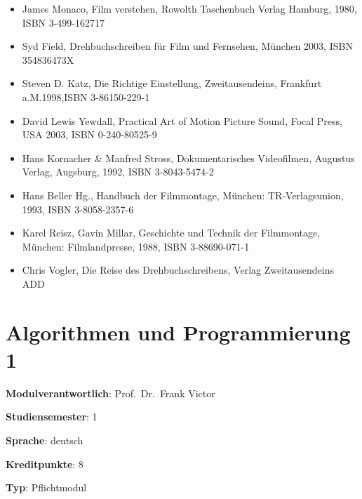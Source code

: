 \begin{itemize}
\tightlist
\item
  James Monaco, Film verstehen, Rowolth Taschenbuch Verlag Hamburg,
  1980, ISBN 3-499-162717
\item
  Syd Field, Drehbuchschreiben für Film und Fernsehen, München 2003,
  ISBN 354836473X
\item
  Steven D. Katz, Die Richtige Einstellung, Zweitausendeins, Frankfurt
  a.M.1998,ISBN 3-86150-229-1
\item
  David Lewis Yewdall, Practical Art of Motion Picture Sound, Focal
  Press, USA 2003, ISBN 0-240-80525-9
\item
  Hans Kornacher \& Manfred Stross, Dokumentarisches Videofilmen,
  Augustus Verlag, Augsburg, 1992, ISBN 3-8043-5474-2
\item
  Hans Beller Hg., Handbuch der Filmmontage, München: TR-Verlagsunion,
  1993, ISBN 3-8058-2357-6
\item
  Karel Reisz, Gavin Millar, Geschichte und Technik der Filmmontage,
  München: Filmlandpresse, 1988, ISBN 3-88690-071-1
\item
  Chris Vogler, Die Reise des Drehbuchschreibens, Verlag Zweitausendeins
  ADD
\end{itemize}

\hypertarget{algorithmen-und-programmierung-1pathlabelmi-2017modulbeschreibungen-bachelorba_algorithmenundprogrammierung1}{%
\chapter{Algorithmen und Programmierung
1\label{/mi-2017/modulbeschreibungen-bachelor/BA_AlgorithmenundProgrammierung1}}\label{algorithmen-und-programmierung-1pathlabelmi-2017modulbeschreibungen-bachelorba_algorithmenundprogrammierung1}}

\begin{modulHead}
\textbf{Modulverantwortlich}: Prof.~Dr.~Frank
Victor
\end{modulHead}
\begin{modulHead}
\textbf{Studiensemester}:
1
\end{modulHead}
\begin{modulHead}
\textbf{Sprache}:
deutsch
\end{modulHead}
\begin{modulHead}
\textbf{Kreditpunkte}:
8
\end{modulHead}
\begin{modulHead}
\textbf{Typ}:
Pflichtmodul
\end{modulHead}


